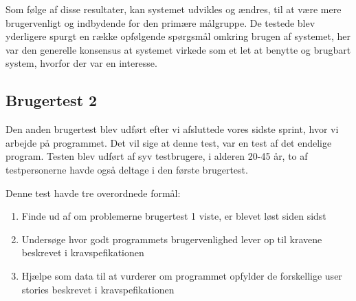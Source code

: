 Som følge af disse resultater, kan systemet udvikles og ændres, til at være mere brugervenligt og indbydende for den primære målgruppe.
De testede blev yderligere spurgt en række opfølgende spørgsmål omkring brugen af systemet, her var den generelle konsensus at systemet virkede som et let at benytte og brugbart system, hvorfor der var en interesse.

\subsection{Brugertest 2}
Den anden brugertest blev udført efter vi afsluttede vores sidste sprint, hvor vi arbejde på programmet.
Det vil sige at denne test, var en test af det endelige program.
Testen blev udført af syv testbrugere, i alderen 20-45 år, to af testpersonerne havde også deltage i den første brugertest.

Denne test havde tre overordnede formål:
\begin{enumerate}
   \item Finde ud af om problemerne brugertest 1 viste, er blevet løst siden sidst
   \item Undersøge hvor godt programmets brugervenlighed lever op til kravene beskrevet i kravspefikationen
   \item Hjælpe som data til at vurderer om programmet opfylder de forskellige user stories beskrevet i kravspefikationen 
\end{enumerate}

